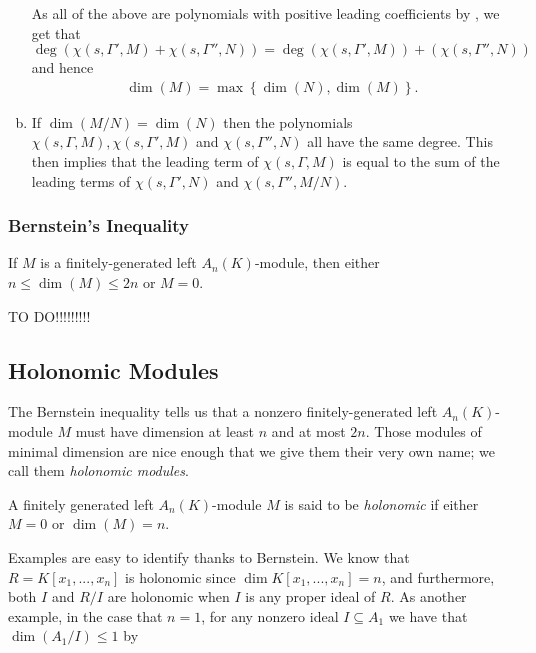 \begin{prf}
\begin{enumerate}[(a)]
		As all of the above are polynomials with positive leading coefficients by , we get that $\deg\left(\chi(s,\Gamma',M) + \chi(s,\Gamma'', N)\right) = \deg\left(\chi(s,\Gamma',M)\right) + \left(\chi(s,\Gamma'', N)\right)$ and hence
		\begin{align*}
			\dim(M) = \max\left\{\dim(N), \dim(M)\right\}.
		\end{align*}
		\item If $\dim(M/N) = \dim(N)$ then the polynomials $\chi(s,\Gamma,M), \chi(s,\Gamma',M)$ and $\chi(s,\Gamma'', N)$ all have the same degree. This then implies that the leading term of $\chi(s,\Gamma, M)$ is equal to the sum of the leading terms of $\chi(s,\Gamma',N)$ and $\chi(s,\Gamma'',M/N)$.
	\end{enumerate}
\end{prf}

\subsubsection{Bernstein's Inequality}

\begin{thm}\label{thm:bern-inequality}
	If $M$ is a finitely-generated left $A_n(K)$-module, then either $n \leq \dim(M)\leq 2n$ or $M = 0$.
\end{thm}
\begin{prf}
	TO DO!!!!!!!!!
\end{prf}

\subsection{Holonomic Modules}

The Bernstein inequality tells us that a nonzero finitely-generated left $A_n(K)$-module $M$ must have dimension at least $n$ and at most $2n$. Those modules of minimal dimension are nice enough that we give them their very own name; we call them \emph{holonomic modules}.
\begin{defn}\label{defn:holonomic-modules}
	A finitely generated left $A_n(K)$-module $M$ is said to be \emph{holonomic} if either $M = 0$ or $\dim(M) = n$.
\end{defn}
Examples are easy to identify thanks to Bernstein. We know that $R = K[x_1,...,x_n]$ is holonomic since $\dim K[x_1,...,x_n] = n$, and furthermore, both $I$ and $R/I$ are holonomic when $I$ is any proper ideal of $R$. As another example, in the case that $n = 1$, for any nonzero ideal $I \subseteq A_1$ we have that $\dim(A_1/I) \leq 1$ by 
